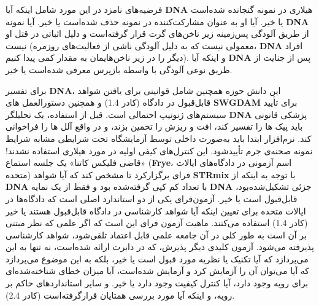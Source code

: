 فرضیه‌های نامزد در این مورد شامل اینکه آیا \textenglish{\textbf{DNA}} هیلاری در نمونه گنجانده شده‌است یا خیر.
آیا او به عنوان مشارکت‌کننده در نمونه حذف شده‌است یا خیر.
آیا نمونه \textenglish{\textbf{DNA}} از طریق آلودگی پس‌زمینه زیر ناخن‌های گرت قرار گرفته‌است و دلیل اثباتی در قتل او نیست (معمولی نیست که به دلیل آلودگی ناشی از فعالیت‌های روزمره، \textenglish{\textbf{DNA}} افراد دیگر را در زیر ناخن‌هایمان به مقدار کمی پیدا کنیم).
و اینکه آیا \textenglish{\textbf{DNA}} پس از جنایت از طریق نوعی آلودگی با واسطه بازپرس معرفی شده‌است یا خیر.

برای تفسیر \textenglish{\textbf{DNA}}، این دانش حوزه همچنین شامل قوانینی برای یافتن شواهد قابل‌قبول در دادگاه (کادر 1.4) و همچنین دستورالعمل های \textenglish{\textbf{SWGDAM}} برای تأیید سیستم‌های ژنوتیپ احتمالی است.
قبل از استفاده، یک تحلیلگر \textenglish{\textbf{DNA}} پزشکی قانونی باید پیک ها را تفسیر کند، افت و ریزش را تخمین بزند، و در واقع آلل ها را فراخوانی کند.
نرم‌افزار ابتدا باید به‌صورت داخلی توسط آزمایشگاه تحت شرایطی مشابه شرایط نمونه صحنه‌ی جرم تأیید‌شود.
این کنترل‌های کیفی اولیه در مورد هیلاری استفاده نشدند!
«قاضی فلیکس کاتنا» یک جلسه استماع (\textenglish{\textbf{Frye}}، اسم آزمونی در دادگاه‌های ایالات متحده) فرای برگزار‌کرد تا مشخص کند که آیا شواهد \textenglish{\textbf{STRmix}} با توجه به اینکه از \textenglish{\textbf{DNA}} با تعداد کم کپی گرفته‌شده بود و فقط از یک نمایه \textenglish{\textbf{DNA}} جزئی تشکیل‌شده‌بود، قابل‌قبول است یا خیر.
آزمون‌فرای یکی از دو استاندارد اصلی است که دادگاه‌ها در ایالات متحده برای تعیین اینکه آیا شواهد کارشناسی در دادگاه قابل‌قبول هستند یا خیر (کادر 1.4) استفاده می‌کنند.
ماهیت آزمون فرای این است که اگر علمی که نظر مبتنی بر آن است به طور کلی در آن جامعه علمی قابل اعتماد تلقی‌شود، شواهد کارشناسی پذیرفته می‌شود.
آزمون کلیدی دیگر پذیرش، که در دابرت ارائه شده‌است، نه تنها به این می‌پردازد که آیا تکنیک یا نظریه مورد قبول است یا خیر، بلکه به این موضوع می‌پردازد که آیا می‌توان آن را آزمایش کرد و آزمایش شده‌است، آیا میزان خطای شناخته‌شده‌ای برای رویه وجود دارد، آیا کنترل کیفیت وجود دارد یا خیر.
و سایر استانداردهای حاکم بر رویه، و اینکه آیا مورد بررسی همتایان قرار‌گرفته‌است (کادر 2.4).


